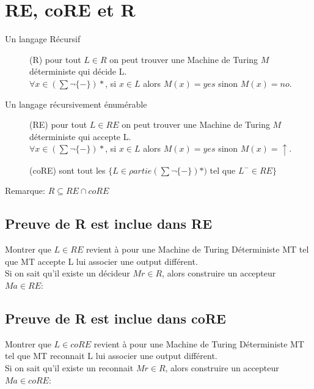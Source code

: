 {\section{RE, coRE et R}
\begin{description}
\item[Un langage Récursif] (R) pour tout $L \in R$ on peut trouver une Machine de Turing $M$ déterministe qui décide L.\\
$\forall x \in (\sum  \neg \{-\})*$, si $x \in L$ alors $M(x)=yes$ sinon $M(x)=no$.
\item[Un langage récursivement énumérable] (RE) pour tout $L \in RE$ on peut trouver une Machine de Turing $M$ déterministe qui accepte L.\\
$\forall x \in (\sum \neg \{-\})*$, si $x \in L$ alors $M(x)=yes$ sinon $M(x)=\uparrow$.
\item[] (coRE) sont tout les $\{ L \in \rho artie(\sum \neg \{-\})*)$ tel que $L^- \in RE \}$
\end{description}
Remarque: $R \subseteq RE \cap coRE$
\pagebreak
\subsection{Preuve de R est inclue dans RE}
Montrer que $L \in RE$ revient à pour une Machine de Turing Déterministe MT tel que MT accepte L lui associer une output différent.\\
Si on sait qu'il existe un décideur $Mr \in R$, alors construire un accepteur $Ma \in RE$:\\


\subsection{Preuve de R est inclue dans coRE}
Montrer que $L \in coRE$ revient à pour une Machine de Turing Déterministe MT tel que MT reconnait L lui associer une output différent.\\
Si on sait qu'il existe un reconnait $Mr \in R$, alors construire un accepteur $Ma \in coRE$:\\

}
